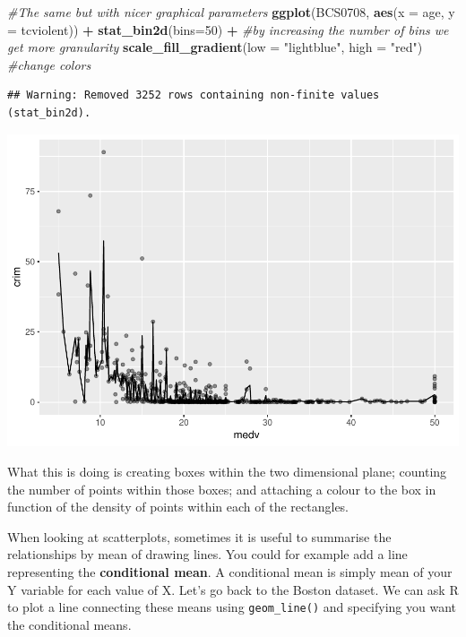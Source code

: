 \documentclass[]{book}
\newenvironment{Shaded}{\begin{snugshade}}{\end{snugshade}}
\newcommand{\CommentTok}[1]{\textcolor[rgb]{0.56,0.35,0.01}{\textit{#1}}}
\newcommand{\DataTypeTok}[1]{\textcolor[rgb]{0.13,0.29,0.53}{#1}}
\newcommand{\DecValTok}[1]{\textcolor[rgb]{0.00,0.00,0.81}{#1}}
\newcommand{\KeywordTok}[1]{\textcolor[rgb]{0.13,0.29,0.53}{\textbf{#1}}}
\newcommand{\NormalTok}[1]{#1}
\newcommand{\OperatorTok}[1]{\textcolor[rgb]{0.81,0.36,0.00}{\textbf{#1}}}
\newcommand{\StringTok}[1]{\textcolor[rgb]{0.31,0.60,0.02}{#1}}
\theoremstyle{definition}
\theoremstyle{definition}
\theoremstyle{definition}
\theoremstyle{remark}
\begin{document}
\begin{Shaded}
\begin{Highlighting}[]
\CommentTok{#The same but with nicer graphical parameters}
\KeywordTok{ggplot}\NormalTok{(BCS0708, }\KeywordTok{aes}\NormalTok{(}\DataTypeTok{x =}\NormalTok{ age, }\DataTypeTok{y =}\NormalTok{ tcviolent)) }\OperatorTok{+}
\StringTok{  }\KeywordTok{stat_bin2d}\NormalTok{(}\DataTypeTok{bins=}\DecValTok{50}\NormalTok{) }\OperatorTok{+}\StringTok{ }\CommentTok{#by increasing the number of bins we get more granularity}
\StringTok{  }\KeywordTok{scale_fill_gradient}\NormalTok{(}\DataTypeTok{low =} \StringTok{"lightblue"}\NormalTok{, }\DataTypeTok{high =} \StringTok{"red"}\NormalTok{) }\CommentTok{#change colors}
\end{Highlighting}
\end{Shaded}

\begin{verbatim}
## Warning: Removed 3252 rows containing non-finite values (stat_bin2d).
\end{verbatim}

\includegraphics{03-visualisation_files/figure-latex/unnamed-chunk-41-1.pdf}

What this is doing is creating boxes within the two dimensional plane;
counting the number of points within those boxes; and attaching a colour
to the box in function of the density of points within each of the
rectangles.

When looking at scatterplots, sometimes it is useful to summarise the
relationships by mean of drawing lines. You could for example add a line
representing the \textbf{conditional mean}. A conditional mean is simply
mean of your Y variable for each value of X. Let's go back to the Boston
dataset. We can ask R to plot a line connecting these means using
\texttt{geom\_line()} and specifying you want the conditional means.
\end{document}
